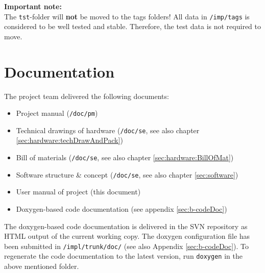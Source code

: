 \textbf{Important note:}\\
The \texttt{tst}-folder will \textbf{not} be moved to the tags folders! All data in \texttt{/imp/tags} is considered to be well tested and stable. Therefore, the test data is not required to move.

\section{Documentation}
\label{sec:work:docu}
The project team delivered the following documents:
\begin{itemize}
	\item Project manual (\texttt{/doc/pm})
	\item Technical drawings of hardware (\texttt{/doc/se}, see also chapter \ref{sec:hardware:techDrawAndPack})
	\item Bill of materials (\texttt{/doc/se}, see also chapter \ref{sec:hardware:BillOfMat})
	\item Software structure \& concept (\texttt{/doc/se}, see also chapter \ref{sec:software})
	\item User manual of project (this document)
	\item Doxygen-based code documentation (see appendix \ref{sec:b-codeDoc})
\end{itemize}

The doxygen-based code documentation is delivered in the SVN repository as HTML output of the current working copy. The doxygen configuration file has been submitted in \texttt{/impl/trunk/doc/} (see also Appendix \ref{sec:b-codeDoc}). To regenerate the code documentation to the latest version, run \texttt{doxygen} in the above mentioned folder.
